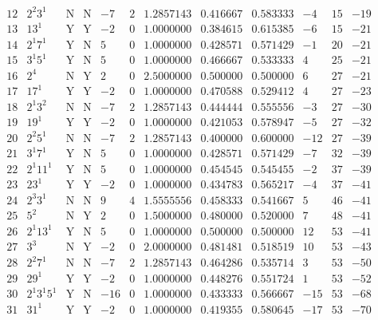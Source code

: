 \documentclass[11pt,reqno,a4letter]{article}
\numberwithin{figure}{section}
\numberwithin{table}{section}
\theoremstyle{plain}
\numberwithin{theorem}{section}
\theoremstyle{definition}
\begin{document}
\begin{table}[ht!]
\begin{equation*}
{\begin{array}{cc|cc|ccc|cc|ccc}
 12 & 2^2 3^1 & \text{N} & \text{N} & -7 & 2 & 1.2857143 & 0.416667 & 0.583333 & -4 & 15 & -19 \\
 13 & 13^1 & \text{Y} & \text{Y} & -2 & 0 & 1.0000000 & 0.384615 & 0.615385 & -6 & 15 & -21 \\
 14 & 2^1 7^1 & \text{Y} & \text{N} & 5 & 0 & 1.0000000 & 0.428571 & 0.571429 & -1 & 20 & -21 \\
 15 & 3^1 5^1 & \text{Y} & \text{N} & 5 & 0 & 1.0000000 & 0.466667 & 0.533333 & 4 & 25 & -21 \\
 16 & 2^4 & \text{N} & \text{Y} & 2 & 0 & 2.5000000 & 0.500000 & 0.500000 & 6 & 27 & -21 \\
 17 & 17^1 & \text{Y} & \text{Y} & -2 & 0 & 1.0000000 & 0.470588 & 0.529412 & 4 & 27 & -23 \\
 18 & 2^1 3^2 & \text{N} & \text{N} & -7 & 2 & 1.2857143 & 0.444444 & 0.555556 & -3 & 27 & -30 \\
 19 & 19^1 & \text{Y} & \text{Y} & -2 & 0 & 1.0000000 & 0.421053 & 0.578947 & -5 & 27 & -32 \\
 20 & 2^2 5^1 & \text{N} & \text{N} & -7 & 2 & 1.2857143 & 0.400000 & 0.600000 & -12 & 27 & -39 \\
 21 & 3^1 7^1 & \text{Y} & \text{N} & 5 & 0 & 1.0000000 & 0.428571 & 0.571429 & -7 & 32 & -39 \\
 22 & 2^1 11^1 & \text{Y} & \text{N} & 5 & 0 & 1.0000000 & 0.454545 & 0.545455 & -2 & 37 & -39 \\
 23 & 23^1 & \text{Y} & \text{Y} & -2 & 0 & 1.0000000 & 0.434783 & 0.565217 & -4 & 37 & -41 \\
 24 & 2^3 3^1 & \text{N} & \text{N} & 9 & 4 & 1.5555556 & 0.458333 & 0.541667 & 5 & 46 & -41 \\
 25 & 5^2 & \text{N} & \text{Y} & 2 & 0 & 1.5000000 & 0.480000 & 0.520000 & 7 & 48 & -41 \\
 26 & 2^1 13^1 & \text{Y} & \text{N} & 5 & 0 & 1.0000000 & 0.500000 & 0.500000 & 12 & 53 & -41 \\
 27 & 3^3 & \text{N} & \text{Y} & -2 & 0 & 2.0000000 & 0.481481 & 0.518519 & 10 & 53 & -43 \\
 28 & 2^2 7^1 & \text{N} & \text{N} & -7 & 2 & 1.2857143 & 0.464286 & 0.535714 & 3 & 53 & -50 \\
 29 & 29^1 & \text{Y} & \text{Y} & -2 & 0 & 1.0000000 & 0.448276 & 0.551724 & 1 & 53 & -52 \\
 30 & 2^1 3^1 5^1 & \text{Y} & \text{N} & -16 & 0 & 1.0000000 & 0.433333 & 0.566667 & -15 & 53 & -68 \\
 31 & 31^1 & \text{Y} & \text{Y} & -2 & 0 & 1.0000000 & 0.419355 & 0.580645 & -17 & 53 & -70 \\

\end{array}}
\end{equation*}
\end{table}
\end{document}
